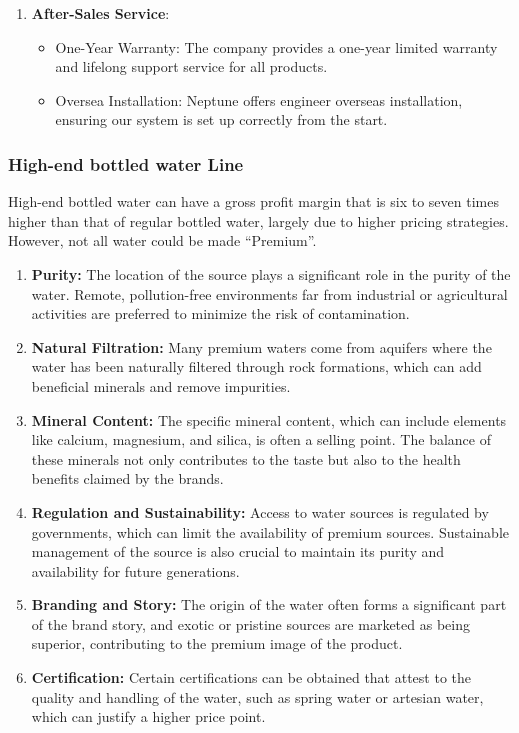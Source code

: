 \documentclass{article}
\begin{document}
\begin{enumerate}
    \item \textbf{After-Sales Service}:
    \begin{itemize}
        \item One-Year Warranty: The company provides a one-year limited warranty and lifelong support service for all products.
        \item Oversea Installation: Neptune offers engineer overseas installation, ensuring our system is set up correctly from the start.
    \end{itemize}
\end{enumerate}

\subsubsection{High-end bottled water Line}
High-end bottled water can have a gross profit margin that is six to seven times higher than that of regular bottled water, largely due to higher pricing strategies. However, not all water could be made “Premium”.

\begin{enumerate}
    \item \textbf{Purity:} The location of the source plays a significant role in the purity of the water. Remote, pollution-free environments far from industrial or agricultural activities are preferred to minimize the risk of contamination.
    
    \item \textbf{Natural Filtration:} Many premium waters come from aquifers where the water has been naturally filtered through rock formations, which can add beneficial minerals and remove impurities.
    
    \item \textbf{Mineral Content:} The specific mineral content, which can include elements like calcium, magnesium, and silica, is often a selling point. The balance of these minerals not only contributes to the taste but also to the health benefits claimed by the brands.
    
    \item \textbf{Regulation and Sustainability:} Access to water sources is regulated by governments, which can limit the availability of premium sources. Sustainable management of the source is also crucial to maintain its purity and availability for future generations.
    
    \item \textbf{Branding and Story:} The origin of the water often forms a significant part of the brand story, and exotic or pristine sources are marketed as being superior, contributing to the premium image of the product.
    
    \item \textbf{Certification:} Certain certifications can be obtained that attest to the quality and handling of the water, such as spring water or artesian water, which can justify a higher price point.
\end{enumerate}
\end{document}
